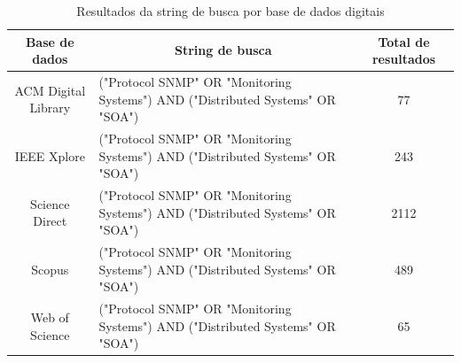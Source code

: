 \begin{table}[!ht]

\centering
\caption{Resultados da string de busca por base de dados digitais}
\label{TabelaRsb}

\begin{tabular}{|c|p{8cm}|c|}
\hline
\multicolumn{1}{|c|}{Base de dados} & \multicolumn{1}{c|}{String de busca}                                           & Total de resultados \\ \hline
ACM Digital Library                 & ("Protocol SNMP" OR "Monitoring Systems") AND ("Distributed Systems" OR "SOA") & 77                  \\ \hline
IEEE Xplore                         & ("Protocol SNMP" OR "Monitoring Systems") AND ("Distributed Systems" OR "SOA") & 243                 \\ \hline
Science Direct                      & ("Protocol SNMP" OR "Monitoring Systems") AND ("Distributed Systems" OR "SOA") & 2112                \\ \hline
Scopus                              & ("Protocol SNMP" OR "Monitoring Systems") AND ("Distributed Systems" OR "SOA") & 489                 \\ \hline
Web of Science                      & ("Protocol SNMP" OR "Monitoring Systems") AND ("Distributed Systems" OR "SOA") & 65                  \\ \hline
\end{tabular}
\end{table}


